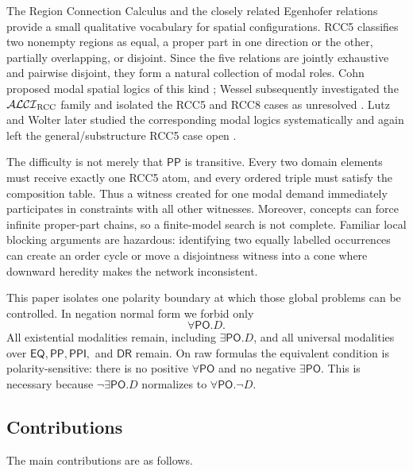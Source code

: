 \documentclass[11pt]{article}
\theoremstyle{plain}
\theoremstyle{definition}
\theoremstyle{remark}
\newcommand{\EQ}{\ensuremath{\mathsf{EQ}}}
\newcommand{\PP}{\ensuremath{\mathsf{PP}}}
\newcommand{\PPI}{\ensuremath{\mathsf{PPI}}}
\newcommand{\PO}{\ensuremath{\mathsf{PO}}}
\newcommand{\DR}{\ensuremath{\mathsf{DR}}}
\begin{document}
The Region Connection Calculus and the closely related Egenhofer relations
provide a small qualitative vocabulary for spatial configurations.  RCC5
classifies two nonempty regions as equal, a proper part in one direction or
the other, partially overlapping, or disjoint.  Since the five relations are
jointly exhaustive and pairwise disjoint, they form a natural collection of
modal roles.  Cohn proposed modal spatial logics of this kind
\cite{Cohn1993}; Wessel subsequently investigated the $\mathcal{ALCI}_{\rm
RCC}$ family and isolated the RCC5 and RCC8 cases as unresolved
\cite{Wessel2003}.  Lutz and Wolter later studied the corresponding modal
logics systematically and again left the general/substructure RCC5 case open
\cite{LutzWolter2006}.

The difficulty is not merely that $\PP$ is transitive.  Every two domain
elements must receive exactly one RCC5 atom, and every ordered triple must
satisfy the composition table.  Thus a witness created for one modal demand
immediately participates in constraints with all other witnesses.  Moreover,
concepts can force infinite proper-part chains, so a finite-model search is
not complete.  Familiar local blocking arguments are hazardous: identifying
two equally labelled occurrences can create an order cycle or move a
disjointness witness into a cone where downward heredity makes the network
inconsistent.

This paper isolates one polarity boundary at which those global problems can
be controlled.  In negation normal form we forbid only
\[
   \forall\PO.D.
\]
All existential modalities remain, including $\exists\PO.D$, and all
universal modalities over $\EQ,\PP,\PPI,$ and $\DR$ remain.  On raw formulas
the equivalent condition is polarity-sensitive: there is no positive
$\forall\PO$ and no negative $\exists\PO$.  This is necessary because
$\neg\exists\PO.D$ normalizes to $\forall\PO.\neg D$.

\subsection{Contributions}

The main contributions are as follows.
\end{document}
